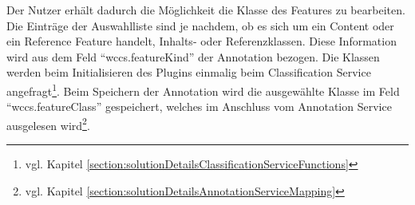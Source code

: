     Der Nutzer erhält dadurch die Möglichkeit die Klasse des Features zu bearbeiten.
    Die Einträge der Auswahlliste sind je nachdem,
    ob es sich um ein Content oder ein Reference Feature handelt,
    Inhalts- oder Referenzklassen.
    Diese Information wird aus dem Feld "`wccs.featureKind"' der Annotation bezogen.
    Die Klassen werden beim Initialisieren des Plugins einmalig beim
    Classification Service angefragt\footnote{vgl. Kapitel \ref{section:solutionDetailsClassificationServiceFunctions}}.
    Beim Speichern der Annotation wird die ausgewählte Klasse im Feld "`wccs.featureClass"' gespeichert,
    welches im Anschluss vom Annotation Service ausgelesen
    wird\footnote{vgl. Kapitel \ref{section:solutionDetailsAnnotationServiceMapping}}.
